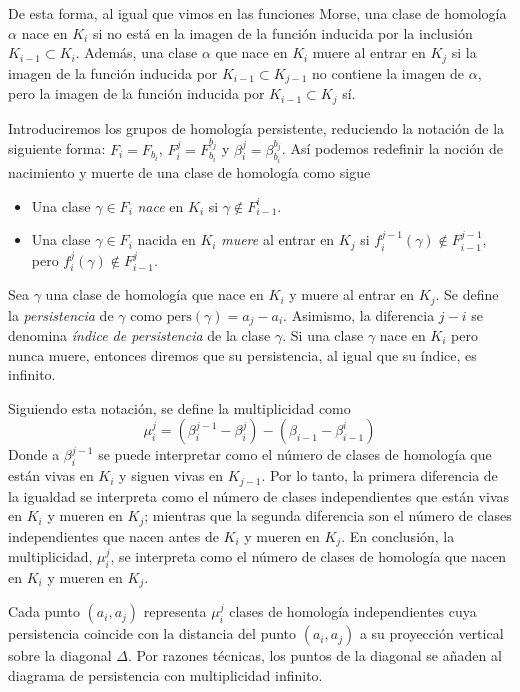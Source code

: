 De esta forma, al igual que vimos en las funciones Morse, una clase de homología $\alpha$ nace en $K_i$ si no está en la imagen de la función inducida por la inclusión $K_{i-1} \subset K_i$. Además, una clase $\alpha$ que nace en $K_i$ muere al entrar en $K_j$ si la imagen de la función inducida por $K_{i-1} \subset K_{j-1}$ no contiene la imagen de $\alpha$, pero la imagen de la función inducida por $K_{i-1} \subset K_j$ sí.

Introduciremos los grupos de homología persistente, reduciendo la notación de la siguiente forma: $F_i = F_{b_i}$, $F_{i}^{j}=F_{b_i}^{b_j}$ y $\beta_{i}^{j}=\beta_{b_i}^{b_j}$. Así podemos redefinir la noción de nacimiento y muerte de una clase de homología como sigue
\begin{itemize}
	\item Una clase $\gamma \in F_i$ \emph{nace} en $K_i$ si $\gamma \notin F_{i-1}^{i}$.
	\item Una clase $\gamma \in F_i$ nacida en $K_i$ \emph{muere} al entrar en $K_j$ si $f_{i}^{j-1}(\gamma)\notin F_{i-1}^{j-1}$, pero $f_{i}^{j}(\gamma)\notin F_{i-1}^{j}$. 
\end{itemize} 

\begin{definition}
Sea $\gamma$ una clase de homología que nace en $K_i$ y muere al entrar en $K_j$. Se define la \emph{persistencia} de $\gamma$ como $\text{pers}(\gamma)= a_j - a_i$. Asimismo, la diferencia $j-i$ se denomina \emph{índice de persistencia} de la clase $\gamma$. Si una clase $\gamma$ nace en $K_i$ pero nunca muere, entonces diremos que su persistencia, al igual que su índice, es infinito.
\end{definition}

Siguiendo esta notación, se define la multiplicidad como
\[
\mu_{i}^{j} = (\beta_{i}^{j-1}-\beta_{i}^{j})-(\beta_{i-1}-\beta_{i-1}^{i})
\]
Donde a $\beta_{i}^{j-1}$ se puede interpretar como el número de clases de homología que están vivas en $K_i$ y siguen vivas en $K_{j-1}$. Por lo tanto, la primera diferencia de la igualdad se interpreta como el número de clases independientes que están vivas en $K_i$ y mueren en $K_j$; mientras que la segunda diferencia son el número de clases independientes que nacen antes de $K_i$ y mueren en $K_j$. En conclusión, la multiplicidad, $\mu_{i}^{j}$, se interpreta como el número de clases de homología que nacen en $K_i$ y mueren en $K_j$.

Cada punto $(a_i, a_j)$ representa $\mu_{i}^{j}$ clases de homología independientes cuya persistencia coincide con la distancia del punto $(a_i, a_j)$ a su proyección vertical sobre la diagonal $\Delta$. Por razones técnicas, los puntos de la diagonal se añaden al diagrama de persistencia con multiplicidad infinito.


